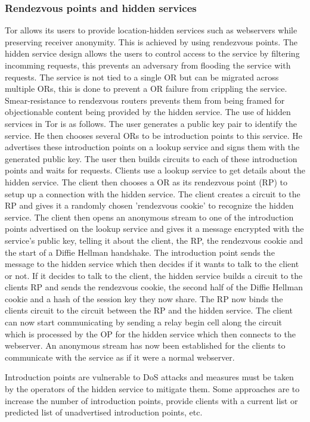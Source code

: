 \documentclass{llncs}
\begin{document}
\subsubsection{Rendezvous points and hidden services}
Tor allows its users to provide location-hidden services such as webservers while preserving receiver anonymity. This is achieved by using rendezvous points. The hidden service design allows the users to control access to the service by filtering incomming requests, this prevents an adversary from flooding the service with requests. The service is not tied to a single OR but can be migrated across multiple ORs, this is done to prevent a OR failure from crippling the service. Smear-resistance to rendezvous routers prevents them from being framed for objectionable content being provided by the hidden service.
The use of hidden services in Tor is as follows. The user generates a public key pair to identify the service. He then chooses several ORs to be introduction points to this service. He advertises these introduction points on a lookup service and signs them with the generated public key. The user then builds circuits to each of these introduction points and waits for requests.
Clients use a lookup service to get details about the hidden service. The client then chooses a OR as its rendezvous point (RP) to setup up a connection with the hidden service. The client creates a circuit to the RP and gives it a randomly chosen 'rendezvous cookie' to recognize the hidden service. The client then opens an anonymous stream to one of the introduction points advertised on the lookup service and gives it a message encrypted with the service's public key, telling it about the client, the RP, the rendezvous cookie and the start of a Diffie Hellman handshake. The introduction point sends the message to the hidden service which then decides if it wants to talk to the client or not.
If it decides to talk to the client, the hidden service builds a circuit to the clients RP and sends the rendezvous cookie, the second half of the Diffie Hellman cookie and a hash of the session key they now share. The RP now binds the clients circuit  to the circuit between the RP and the hidden service. The client can now start communicating by sending a relay begin cell along the circuit which is processed by the OP for the hidden service which then connects to the webserver. An anonymous stream has now been established for the clients to communicate with the service as if it were a normal webserver.

Introduction points are vulnerable to DoS attacks and measures must be taken by the operators of the hidden service to mitigate them. Some approaches are to increase the number of introduction points, provide clients with a current list or predicted list of unadvertised introduction points, etc.
\end{document}
